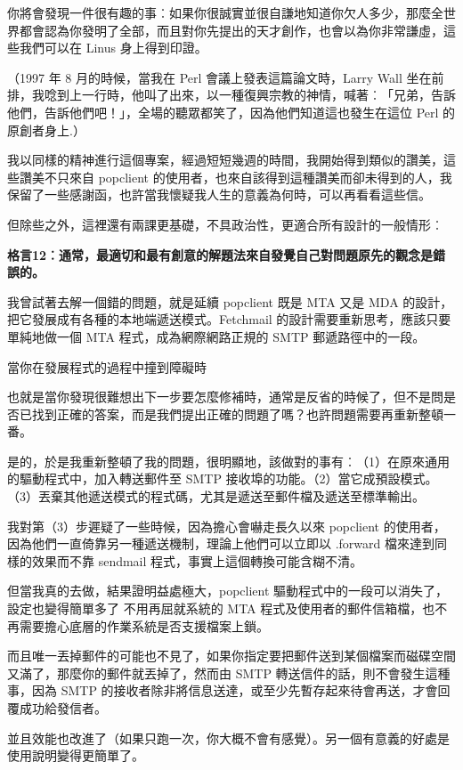 \documentclass[10pt, b5paper]{book}
\makeatletter
\newcommand*{\shifttext}[2]{%
  \settowidth{\@tempdima}{#2}%
  \makebox[\@tempdima]{\hspace*{#1}#2}%
}
\makeatother
\begin{document}
你將會發現一件很有趣的事︰如果你很誠實並很自謙地知道你欠人多少，那麼全世界都會認為你發明了全部，而且對你先提出的天才創作，也會以為你非常謙虛，這些我們可以在
Linus 身上得到印證。

（1997 年 8 月的時候，當我在 Perl 會議上發表這篇論文時，Larry Wall
坐在前排，我唸到上一行時，他叫了出來，以一種復興宗教的神情，喊著︰「兄弟，告訴他們，告訴他們吧！」，全場的聽眾都笑了，因為他們知道這也發生在這位
Perl 的原創者身上.）

我以同樣的精神進行這個專案，經過短短幾週的時間，我開始得到類似的讚美，這些讚美不只來自
popclient
的使用者，也來自該得到這種讚美而卻未得到的人，我保留了一些感謝函，也許當我懷疑我人生的意義為何時，可以再看看這些信。

但除些之外，這裡還有兩課更基礎，不具政治性，更適合所有設計的一般情形︰

\textbf{格言12︰通常，最適切和最有創意的解題法來自發覺自己對問題原先的觀念是錯誤的。}

我曾試著去解一個錯的問題，就是延續 popclient 既是 MTA 又是 MDA
的設計，把它發展成有各種的本地端遞送模式。Fetchmail
的設計需要重新思考，應該只要單純地做一個 MTA 程式，成為網際網路正規的 SMTP
郵遞路徑中的一段。

當你在發展程式的過程中撞到障礙時 \shifttext{1pt}{---}\shifttext{-1pt}{---}
也就是當你發現很難想出下一步要怎麼修補時，通常是反省的時候了，但不是問是否已找到正確的答案，而是我們提出正確的問題了嗎？也許問題需要再重新整頓一番。

是的，於是我重新整頓了我的問題，很明顯地，該做對的事有︰（1）在原來通用的驅動程式中，加入轉送郵件至
SMTP
接收埠的功能。（2）當它成預設模式。（3）丟棄其他遞送模式的程式碼，尤其是遞送至郵件檔及遞送至標準輸出。

我對第（3）步遲疑了一些時候，因為擔心會嚇走長久以來 popclient
的使用者，因為他們一直倚靠另一種遞送機制，理論上他們可以立即以 .forward
檔來達到同樣的效果而不靠 sendmail 程式，事實上這個轉換可能含糊不清。

但當我真的去做，結果證明益處極大，popclient
驅動程式中的一段可以消失了，設定也變得簡單多了 \shifttext{1pt}{---}\shifttext{-1pt}{---} 不用再屈就系統的
MTA
程式及使用者的郵件信箱檔，也不再需要擔心底層的作業系統是否支援檔案上鎖。

而且唯一丟掉郵件的可能也不見了，如果你指定要把郵件送到某個檔案而磁碟空間又滿了，那麼你的郵件就丟掉了，然而由
SMTP 轉送信件的話，則不會發生這種事，因為 SMTP
的接收者除非將信息送達，或至少先暫存起來待會再送，才會回覆成功給發信者。

並且效能也改進了（如果只跑一次，你大概不會有感覺）。另一個有意義的好處是使用說明變得更簡單了。
\end{document}
